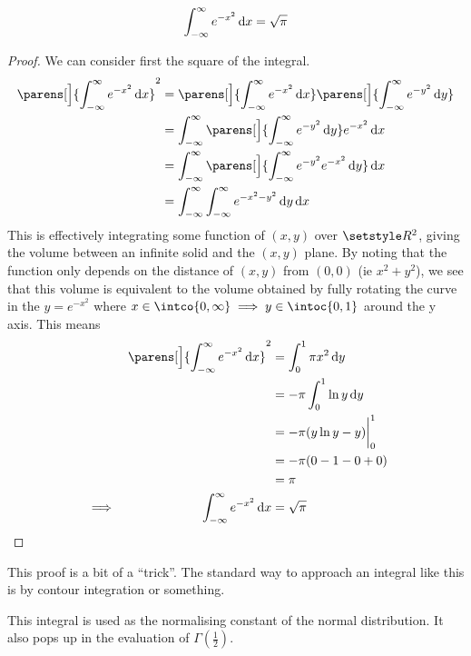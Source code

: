 \begin{theorem} \label{thm_gauss_integral}
\begin{equation*}
\integ[-\infty]<\infty>{e^{-x^2}}{x} = \sqrt \pi
\end{equation*}
\end{theorem}
\begin{proof}
We can consider first the square of the integral.
\begin{align*}
    \parens[\Big]{\integ[-\infty]<\infty>{e^{-x^2}}{x}}^2
    &= \parens[\Big]{\integ[-\infty]<\infty>{e^{-x^2}}{x}}
       \parens[\Big]{\integ[-\infty]<\infty>{e^{-y^2}}{y}} \\
    &= \integ[-\infty]<\infty>{
                   \parens[\Big]{\integ[-\infty]<\infty>{e^{-y^2}}{y}}
               e^{-x^2}}{x} \\
    &= \integ[-\infty]<\infty>{
           \parens[\Big]{\integ[-\infty]<\infty>{e^{-y^2} e^{-x^2}}{y}}}{x} \\
    &= \integ[-\infty]<\infty>{
           \integ[-\infty]<\infty>{e^{-x^2-y^2}}{y}}{x}
\end{align*}
This is effectively integrating some function of \((x, y)\) over
\(\Reals^2\), giving the volume between an infinite solid and the \((x, y)\)
plane. By noting that the function only depends on the distance of
\((x, y)\) from \((0, 0)\) (ie \(x^2 + y^2\)), we see that this volume is
equivalent to the volume obtained by fully rotating the curve in the
\(y = e^{-x^2}\) where
\(x \in \intco{0, \infty} \implies y \in \intoc{0, 1}\) around the y axis.
This means
\begin{alignat*}{2}
    && \parens[\Big]{\integ[-\infty]<\infty>{e^{-x^2}}{x}}^2
    &= \integ[0]<1>{\pi x^2}{y} \\
&&  &= -\pi \integ[0]<1>{\ln y}{y} \\
&&  &= -\pi (y\ln y - y)\eval_0^1 \\
&&  &= -\pi (0 - 1 - 0 + 0) \\
&&  &= \pi \\
&\implies& \integ[-\infty]<\infty>{e^{-x^2}}{x}
    &= \sqrt \pi \qedhere
\end{alignat*}
\end{proof}
This proof is a bit of a ``trick''. The standard way to approach an integral
like this is by contour integration or something.

This integral is used as the normalising constant of the normal
distribution. It also pops up in the evaluation of \(\Gamma(\frac 12)\).

